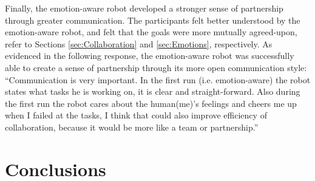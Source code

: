 \documentclass{sig-alternate-05-2015}
\begin{document}
Finally, the emotion-aware robot developed a stronger sense of  partnership
through greater communication. The participants felt better understood by the
emotion-aware robot, and felt that the goals were more mutually agreed-upon,
refer to Sections \ref{sec:Collaboration} and \ref{sec:Emotions}, respectively. As
evidenced in the following response, the emotion-aware robot was successfully
able to create a sense of partnership through its more open communication style:
``Communication is very important. In the first run (i.e. emotion-aware) the
robot states what tasks he is working on, it is clear and straight-forward. Also
during the first run the robot cares about the human(me)'s feelings and cheers
me up when I failed at the tasks, I think that could also improve efficiency of
collaboration, because it would be more like a team or partnership.''


\section{Conclusions}


%

%
%
\end{document}
